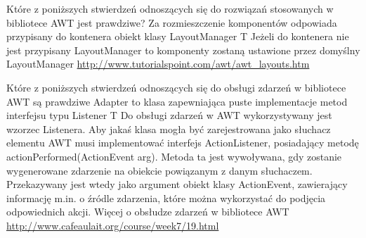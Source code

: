 \answer
{Które z poniższych stwierdzeń odnoszących się do rozwiązań stosowanych w bibliotece AWT jest prawdziwe?}
{Za rozmieszczenie komponentów odpowiada przypisany do kontenera obiekt klasy LayoutManager}
{T}
{Jeżeli do kontenera nie jest przypisany LayoutManager to komponenty zostaną ustawione przez domyślny LayoutManager}
{\url{http://www.tutorialspoint.com/awt/awt_layouts.htm}}

\answer
{Które z poniższych stwierdzeń odnoszących się do obsługi zdarzeń w bibliotece AWT są prawdziwe}
{ Adapter to klasa zapewniająca puste implementacje metod interfejsu typu Listener}
{T}
{Do obsługi zdarzeń w AWT wykorzystywany jest wzorzec Listenera. Aby jakaś klasa mogła być zarejestrowana jako słuchacz elementu AWT musi implementować interfejs ActionListener, posiadający metodę actionPerformed(ActionEvent arg). Metoda ta jest wywoływana, gdy zostanie wygenerowane zdarzenie na obiekcie powiązanym z danym słuchaczem. Przekazywany jest wtedy jako argument obiekt klasy ActionEvent, zawierający informację m.in. o źródle zdarzenia, które można wykorzystać do podjęcia odpowiednich akcji.}
{Więcej o obsłudze zdarzeń w bibliotece AWT \url{http://www.cafeaulait.org/course/week7/19.html}}

